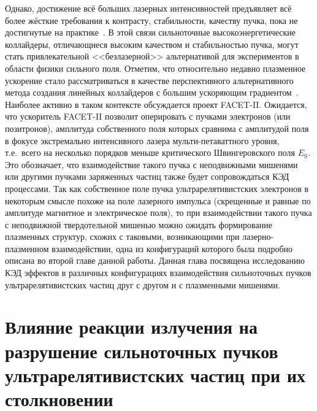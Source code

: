Однако, достижение всё больших лазерных интенсивностей предъявляет всё более жёсткие требования к контрасту, стабильности, качеству пучка, пока не достигнутые на практике~\cite{danson2019petawatt}.
В этой связи сильноточные высокоэнергетические коллайдеры, отличающиеся высоким качеством и стабильностью пучка, могут стать привлекательной <<безлазерной>> альтернативой для экспериментов в области физики сильного поля.
Отметим, что относительно недавно плазменное ускорение стало рассматриваться в качестве перспективного альтернативного метода создания линейных коллайдеров с большим ускоряющим градиентом~\cite{schroeder2010physics}.
Наиболее активно в таком контексте обсуждается проект FACET-II\cite{FACET, yakimenko2019prospect, del2019bright}.
Ожидается, что ускоритель FACET-II \cite{FACET} позволит оперировать с пучками электронов (или позитронов), амплитуда собственного поля которых сравнима с амплитудой поля в фокусе экстремально интенсивного лазера мульти-петаваттного уровня, т.е.~всего на несколько порядков меньше критического Швингеровского поля $E_\mathrm{S}$.
Это обозначает, что взаимодействие такого пучка с неподвижными мишенями или другими пучками заряженных частиц также будет сопровождаться КЭД процессами.
Так как собственное поле пучка ультрарелятивистских электронов в некоторым смысле похоже на поле лазерного импульса (скрещенные и равные по амплитуде магнитное и электрическое поля), то при взаимодействии такого пучка с неподвижной твердотельной мишенью можно ожидать формирование плазменных структур, схожих с таковыми, возникающими при лазерно-плазменном взаимодействии, одна из конфигураций которого была подробно описана во второй главе данной работы.
Данная глава посвящена исследованию КЭД эффектов в различных конфигурациях взаимодействия сильноточных пучков ультрарелятивистских частиц друг с другом и с плазменными мишенями. 

\section{Влияние реакции излучения на разрушение сильноточных пучков ультрарелятивистских частиц при их столкновении}\label{sec:ch3/sec3}

